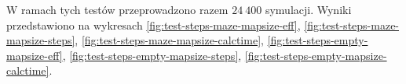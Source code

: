 W ramach tych testów przeprowadzono razem $24\ 400$ symulacji.
Wyniki przedstawiono na wykresach \ref{fig:test-steps-maze-mapsize-eff}, \ref{fig:test-steps-maze-mapsize-steps}, \ref{fig:test-steps-maze-mapsize-calctime}, \ref{fig:test-steps-empty-mapsize-eff}, \ref{fig:test-steps-empty-mapsize-steps}, \ref{fig:test-steps-empty-mapsize-calctime}.


